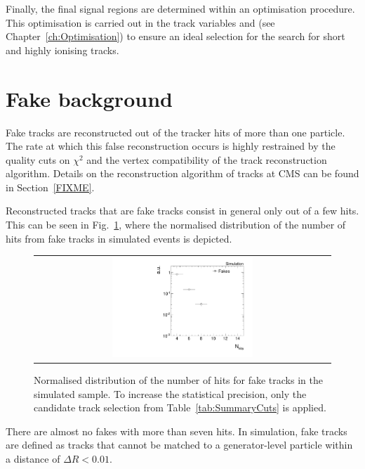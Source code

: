 Finally, the final signal regions are determined within an optimisation procedure.
This optimisation is carried out in the track variables \pt and \dedx (see Chapter~\ref{ch:Optimisation}) to ensure an ideal selection for the search for short and  highly ionising tracks.

\section{Fake background}
\label{sec:FakeBkg}
Fake tracks are reconstructed out of the tracker hits of more than one particle.
The rate at which this false reconstruction occurs is highly restrained by the quality cuts on $\chi^2$ and the vertex compatibility of the track reconstruction algorithm.
Details on the reconstruction algorithm of tracks at CMS can be found in Section~\ref{FIXME}.

Reconstructed tracks that are fake tracks consist in general only out of a few hits.
This can be seen in Fig.~\ref{fig:NValidFakes}, where the normalised distribution of the number of hits from fake tracks in simulated \WJets events is depicted.
\begin{figure}[!b]
  \centering 
  \begin{tabular}{c}
    \includegraphics[width=0.49\textwidth]{figures/analysis_2/Background/NValidForFakes_chiTracksfullSelectionNoQCDCutsNoTrigger.pdf}
  \end{tabular}
  \caption{Normalised distribution of the number of hits for fake tracks in the simulated \WJets sample. To increase the statistical precision, only the candidate track selection from Table~\ref{tab:SummaryCuts} is applied.}
  \label{fig:NValidFakes}
\end{figure}
There are almost no fakes with more than seven hits.
In simulation, fake tracks are defined as tracks that cannot be matched to a generator-level particle within a distance of $\Delta R < 0.01$.

